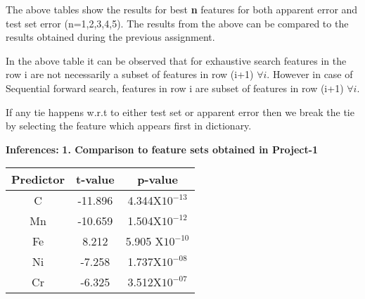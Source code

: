 \documentclass[paper=a4, fontsize=11pt]{scrartcl} %
\begin{document}
The above tables show the results for best \textbf{n} features for both apparent error and test set error (n=1,2,3,4,5). The results from the above can be compared to the results obtained during the previous assignment.
\newline

In the above table it can be observed that for exhaustive search features in the row i are not necessarily a subset of features in row (i+1) $\forall i$. However in case of Sequential forward search, features in row i are subset of features in row (i+1) $\forall i$. \newline

If any tie happens w.r.t to either test set or apparent error then we break the tie by selecting the feature which appears first in dictionary.

\newpage
\Large
\textbf{Inferences:}
\normalsize \newline \newline
\textbf{1. Comparison to feature sets obtained in Project-1 }


\begin{center}

\begin{tabular}{c c c}
\hline
\large
\textbf{Predictor} \cellcolor{green!35} & \textbf{t-value} \cellcolor{green!35} & \textbf{p-value} \cellcolor{green!35} \\ [0.5cm]\hline
\hline C   \cellcolor{yellow!35}      & -11.896 \cellcolor{yellow!35} &  \cellcolor{yellow!35} 4.344X$10^{-13}$ \cellcolor{yellow!35}      \\[0.5cm] 
 Mn   \cellcolor{orange!35}     & -10.659\cellcolor{orange!35} &   1.504X$10^{-12}$ \cellcolor{orange!35}      \\[0.5cm] 
 Fe  \cellcolor{yellow!35}      & 8.212 \cellcolor{yellow!35}  & 5.905 X$10^{-10}$       \cellcolor{yellow!35} \\[0.5cm]
 Ni \cellcolor{orange!35}       & -7.258 \cellcolor{orange!35}   &   1.737X$10^{-08}$     \cellcolor{orange!35} \\[0.5cm]
 Cr   \cellcolor{yellow!35}     & -6.325 \cellcolor{yellow!35}   & 3.512X$10^{-07}$ \cellcolor{yellow!35}       \\[0.5cm]  
\end{tabular} 
\end{center}

\end{document}
